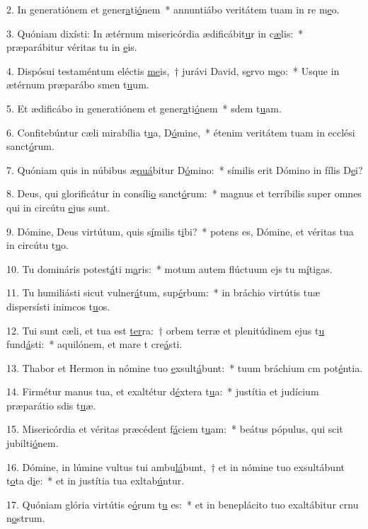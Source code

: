 2. In generatiónem et gener\uline{a}ti\uline{ó}nem~* annuntiábo veritátem tuam in re m\uline{e}o.\par 
3. Quóniam dixísti: In ætérnum misericórdia ædificábit\uline{u}r in c\uline{æ}lis:~* præparábitur véritas tu in \uline{e}is.\par 
4. Dispósui testaméntum eléctis \uline{me}is,~† jurávi David, s\uline{e}rvo m\uline{e}o:~* Usque in ætérnum præparábo smen t\uline{u}um.\par 
5. Et ædificábo in generatiónem et gener\uline{a}ti\uline{ó}nem~* sdem t\uline{u}am.\par 
6. Confitebúntur cæli mirabília t\uline{u}a, D\uline{ó}mine,~* étenim veritátem tuam in ecclési sanct\uline{ó}rum.\par 
7. Quóniam quis in núbibus æ\uline{quá}bitur D\uline{ó}mino:~* símilis erit Dómino in fílis D\uline{e}i?\par 
8. Deus, qui glorificátur in consíli\uline{o} sanct\uline{ó}rum:~* magnus et terríbilis super omnes qui in circútu \uline{e}jus sunt.\par 
9. Dómine, Deus virtútum, quis s\uline{í}milis t\uline{i}bi?~* potens es, Dómine, et véritas tua in circútu t\uline{u}o.\par 
10. Tu domináris potest\uline{á}ti m\uline{a}ris:~* motum autem flúctuum ejs tu m\uline{í}tigas.\par 
11. Tu humiliásti sicut vulner\uline{á}tum, sup\uline{é}rbum:~* in bráchio virtútis tuæ dispersísti inimcos t\uline{u}os.\par 
12. Tui sunt cæli, et tua est \uline{ter}ra:~† orbem terræ et plenitúdinem ejus t\uline{u} fund\uline{á}sti:~* aquilónem, et mare t cre\uline{á}sti.\par 
13. Thabor et Hermon in nómine tuo \uline{e}xsult\uline{á}bunt:~* tuum bráchium cm pot\uline{é}ntia.\par 
14. Firmétur manus tua, et exaltétur d\uline{é}xtera t\uline{u}a:~* justítia et judícium præparátio sdis t\uline{u}æ.\par 
15. Misericórdia et véritas præcédent f\uline{á}ciem t\uline{u}am:~* beátus pópulus, qui scit jubilti\uline{ó}nem.\par 
16. Dómine, in lúmine vultus tui ambu\uline{lá}bunt,~† et in nómine tuo exsultábunt t\uline{o}ta d\uline{i}e:~* et in justítia tua exltab\uline{ú}ntur.\par 
17. Quóniam glória virtútis e\uline{ó}rum t\uline{u} es:~* et in beneplácito tuo exaltábitur crnu n\uline{o}strum.\par 
